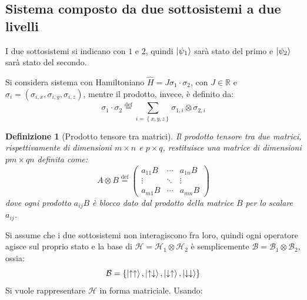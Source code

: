 \documentclass[10pt, a4paper]{scrartcl}
\numberwithin{equation}{subsection}
\theoremstyle{style2}
\theoremstyle{style1}
\newtheorem{definizione}{Definizione}[section]
\begin{document}
\subsection{Sistema composto da due sottosistemi a due livelli}
I due sottosistemi si indicano con $1$ e $2$, quindi $\ket{\psi _1}$ sar\`a stato del primo e $\ket{\psi _2} $ sar\`a stato del secondo.

Si considera sistema con Hamiltoniano $\hat{H} = J \sigma _1 \cdot \sigma _2$, con $J \in \mathbb{R}$ e $\sigma _i = (\sigma _{i,x} , \sigma _{i,y} , \sigma _{i,z} )$, mentre il prodotto, invece, \`e definito da:
\begin{equation}
	\sigma _1 \cdot \sigma _2 \overset{\text{def}}{=} \sum_{i=\left\{ x,y,z \right\} }^{} \sigma _{1,i} \otimes \sigma _{2,i} 
\end{equation}
\begin{definizione}[Prodotto tensore tra matrici]
	Il prodotto tensore tra due matrici, rispettivamente di dimensioni $m \times n$ e $p \times q$, restituisce una matrice di dimensioni $pm  \times  qn$ definita come:
	\begin{equation}
		A \otimes B \overset{\text{def}}{=} \begin{pmatrix} a_{11} B & \cdots & a_{1n} B\\ \vdots & \ddots&\vdots \\ a_{m1}B & \cdots  & a_{mn} B\end{pmatrix} 
	\end{equation}
	dove ogni prodotto $a_{ij} B$ \`e blocco dato dal prodotto della matrice $B$ per lo scalare $a_{ij} $. 
\end{definizione}
\noindent Si assume che i due sottosistemi non interagiscono fra loro, quindi ogni operatore agisce sul proprio stato e la base di $\mathcal{H} = \mathcal{H}_1 \otimes \mathcal{H}_2$ \`e semplicemente $\mathcal{B} = \mathcal{B}_1 \otimes \mathcal{B}_2$, ossia:
\begin{equation}
	\mathcal{B} = \left\{ \ket{\uparrow \uparrow} , \ket{\uparrow \downarrow} , \ket{\downarrow \uparrow}, \ket{\downarrow \downarrow}   \right\} 
\end{equation}
Si vuole rappresentare $\mathcal{H}$ in forma matriciale. Usando:
\end{document}
